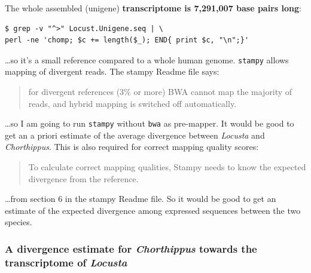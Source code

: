 \documentclass{article}\usepackage[]{graphicx}\usepackage[]{color}
\begin{document}
The whole assembled (unigene) \textbf{transcriptome is 7,291,007 base pairs long}:
\begin{Verbatim}
$ grep -v "^>" Locust.Unigene.seq | \
perl -ne 'chomp; $c += length($_); END{ print $c, "\n";}'
\end{Verbatim}
\ldots so it's a small reference compared to a whole human genome.
\texttt{stampy} allows mapping of divergent reads. The stampy Readme file says:
\begin{quote}
\textsf{
for divergent references (3\% or more) BWA cannot map
the majority of reads, and hybrid mapping is switched off
automatically.
}
\end{quote}
\ldots so I am going to run \texttt{stampy} without \texttt{bwa} as pre-mapper.
It would be good to get an a priori estimate of the average divergence between \textit{Locusta} and \textit{Chorthippus}. This is also required for correct mapping quality scores:
\begin{quote}
\textsf{
To calculate correct mapping qualities, Stampy needs to know the
expected divergence from the reference.
}
\end{quote}
\ldots from section 6 in the stampy Readme file. So it would be good to get an estimate of the expected divergence among expressed sequences between the two species. 

\subsubsection{A divergence estimate for \textit{Chorthippus} towards the transcriptome of \textit{Locusta}}
\end{document}
